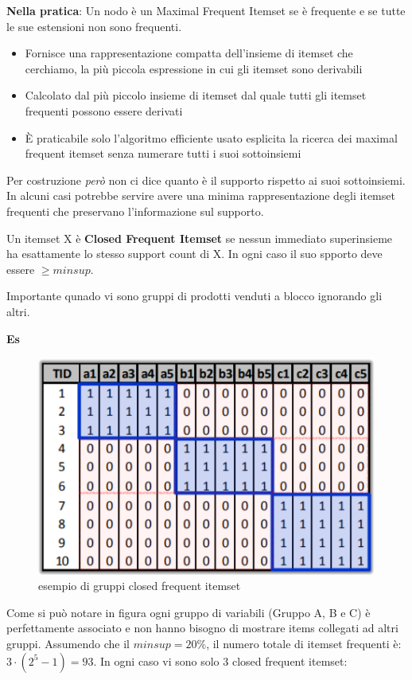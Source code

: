 \textbf{Nella pratica}: Un nodo \`e un Maximal Frequent Itemset se \`e frequente e se tutte le sue estensioni non sono frequenti.\\
\begin{itemize}
	\item Fornisce una rappresentazione compatta dell'insieme di itemset che cerchiamo, la pi\`u piccola espressione in cui gli itemset sono derivabili
	\item Calcolato dal più piccolo insieme di itemset dal quale tutti gli itemset frequenti possono essere derivati
	\item È praticabile solo l'algoritmo efficiente usato esplicita la ricerca dei maximal frequent itemset senza numerare tutti i suoi sottoinsiemi
\end{itemize}
Per costruzione \textit{per\`o} non ci dice quanto \`e il supporto rispetto ai suoi sottoinsiemi. In alcuni casi potrebbe servire avere una minima rappresentazione degli itemset frequenti che preservano l'informazione sul supporto.

\begin{defn}
	Un itemset X è \textbf{Closed Frequent Itemset} se nessun immediato superinsieme ha esattamente lo stesso support count di X. In ogni caso il suo spporto deve essere $\ge minsup$.
\end{defn}
Importante qunado vi sono gruppi di prodotti venduti a blocco ignorando gli altri.

\textbf{Es}
\begin{figure}[H]
	\centering
	\includegraphics[height=0.5 \linewidth]{Association/pict/close_freq_itemset.png}
	\caption{esempio di gruppi closed frequent itemset}
\end{figure}

Come si può notare in figura ogni gruppo di variabili (Gruppo A, B e C) è perfettamente associato e non hanno bisogno di mostrare items collegati ad altri gruppi. Assumendo che il $minsup = 20\%$, il numero totale di itemset frequenti è: $3 \cdot (2^5 -1) = 93$. In ogni caso vi sono solo 3 closed frequent itemset: 

